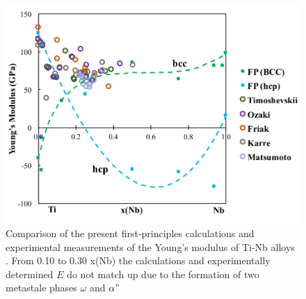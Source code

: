 \newpage
\begin{figure}[H]
	\centering
	\includegraphics[width=\textwidth]{Chapter-1/Figures/TiNbElastic.png}
	\caption{Comparison of the present first-principles calculations and experimental measurements of the Young's modulus of Ti-Nb alloys \cite{Timoshevskii2011,Ozaki2004,Friak2012,Karre2015,Matsumoto2006}. From 0.10 to 0.30 x(Nb) the calculations and experimentally determined $E$ do not match up due to the formation of two metastale phases $\omega$ and $\alpha"$}
	\label{Ch1-figure:tinbelasitc}
\end{figure}
